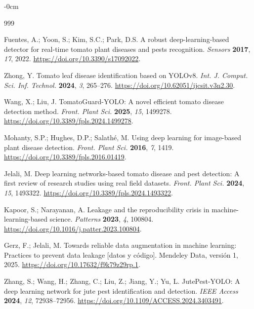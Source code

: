 \documentclass[sensors,article,submit,pdftex,moreauthors]{Definitions/mdpi}
\begin{document}

\begin{adjustwidth}{-\extralength}{0cm}
\begin{thebibliography}{999}

Fuentes, A.; Yoon, S.; Kim, S.C.; Park, D.S. A robust deep-learning-based detector for real-time tomato plant diseases and pests recognition. {\em Sensors} {\bf 2017}, {\em 17}, 2022. \url{https://doi.org/10.3390/s17092022}.

Zhong, Y. Tomato leaf disease identification based on YOLOv8. {\em Int. J. Comput. Sci. Inf. Technol.} {\bf 2024}, {\em 3}, 265--276. \url{https://doi.org/10.62051/ijcsit.v3n2.30}.

Wang, X.; Liu, J. TomatoGuard-YOLO: A novel efficient tomato disease detection method. {\em Front. Plant Sci.} {\bf 2025}, {\em 15}, 1499278. \url{https://doi.org/10.3389/fpls.2024.1499278}.

Mohanty, S.P.; Hughes, D.P.; Salath\'e, M. Using deep learning for image-based plant disease detection. {\em Front. Plant Sci.} {\bf 2016}, {\em 7}, 1419. \url{https://doi.org/10.3389/fpls.2016.01419}.

Jelali, M. Deep learning networks-based tomato disease and pest detection: A first review of research studies using real field datasets. {\em Front. Plant Sci.} {\bf 2024}, {\em 15}, 1493322. \url{https://doi.org/10.3389/fpls.2024.1493322}.

Kapoor, S.; Narayanan, A. Leakage and the reproducibility crisis in machine-learning-based science. {\em Patterns} {\bf 2023}, {\em 4}, 100804. \url{https://doi.org/10.1016/j.patter.2023.100804}.

{\color{blue} Gerz, F.; Jelali, M. Towards reliable data augmentation in machine learning: Practices to prevent data leakage [datos y código]. Mendeley Data, versión 1, 2025. \url{https://doi.org/10.17632/f9k79z29rp.1}.}

{\color{blue} Zhang, S.; Wang, H.; Zhang, C.; Liu, Z.; Jiang, Y.; Yu, L. JutePest-YOLO: A deep learning network for jute pest identification and detection. {\em IEEE Access} {\bf 2024}, {\em 12}, 72938--72956. \url{https://doi.org/10.1109/ACCESS.2024.3403491}.}


\end{thebibliography}
\end{adjustwidth}
\end{document}
